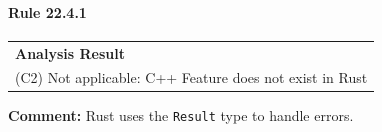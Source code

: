 \paragraph{Rule 22.4.1}
\begin{longtable}{p{13cm}}
\textbf{Analysis Result} \\
(C2) Not applicable: C++ Feature does not exist in Rust \\
\end{longtable}
\textbf{Comment:} Rust uses the \texttt{Result} type to handle errors. \\
